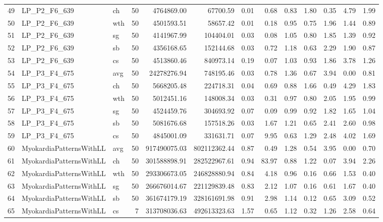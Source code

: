 \documentclass{article}
\begin{document}
\begin{table}[ht]
{\begin{tabular}{lllrrrrrrrrrr}
49 & LP_P2_F6_639 & ch & 50 & 4764869.00 & 67700.59 & 0.01 & 0.68 & 0.83 & 1.80 & 0.35 & 4.79 & 1.99 \\
50 & LP_P2_F6_639 & wth & 50 & 4501593.51 & 58657.42 & 0.01 & 0.18 & 0.95 & 0.75 & 1.96 & 1.44 & 0.89 \\
51 & LP_P2_F6_639 & sg & 50 & 4141967.99 & 104404.01 & 0.03 & 0.08 & 1.05 & 0.80 & 1.85 & 1.39 & 0.92 \\
52 & LP_P2_F6_639 & sb & 50 & 4356168.65 & 152144.68 & 0.03 & 0.72 & 1.18 & 0.63 & 2.29 & 1.90 & 0.87 \\
53 & LP_P2_F6_639 & cs & 50 & 4513860.46 & 840973.14 & 0.19 & 0.07 & 1.03 & 0.93 & 1.86 & 3.78 & 1.26 \\
54 & LP_P3_F4_675 & avg & 50 & 24278276.94 & 748195.46 & 0.03 & 0.78 & 1.36 & 0.67 & 3.94 & 0.00 & 0.81 \\
55 & LP_P3_F4_675 & ch & 50 & 5668205.48 & 224718.31 & 0.04 & 0.69 & 0.88 & 1.66 & 0.49 & 4.29 & 1.83 \\
56 & LP_P3_F4_675 & wth & 50 & 5012451.16 & 148008.34 & 0.03 & 0.31 & 0.97 & 0.80 & 2.05 & 1.95 & 0.99 \\
57 & LP_P3_F4_675 & sg & 50 & 4524459.76 & 304693.92 & 0.07 & 0.09 & 0.99 & 0.92 & 1.82 & 1.65 & 1.04 \\
58 & LP_P3_F4_675 & sb & 50 & 5081676.68 & 157518.26 & 0.03 & 1.67 & 1.21 & 0.65 & 2.41 & 2.60 & 0.98 \\
59 & LP_P3_F4_675 & cs & 50 & 4845001.09 & 331631.71 & 0.07 & 9.95 & 0.63 & 1.29 & 2.48 & 4.02 & 1.69 \\
60 & MyokardiaPatternsWithLL & avg & 50 & 917490075.03 & 802112362.44 & 0.87 & 0.49 & 1.28 & 0.54 & 3.95 & 0.00 & 0.70 \\
61 & MyokardiaPatternsWithLL & ch & 50 & 301588898.91 & 282522967.61 & 0.94 & 83.97 & 0.88 & 1.22 & 0.07 & 3.94 & 2.26 \\
62 & MyokardiaPatternsWithLL & wth & 50 & 293306673.05 & 246828880.94 & 0.84 & 4.18 & 0.96 & 0.16 & 0.66 & 1.53 & 0.40 \\
63 & MyokardiaPatternsWithLL & sg & 50 & 266676014.67 & 221129839.48 & 0.83 & 2.12 & 1.07 & 0.16 & 0.61 & 1.67 & 0.40 \\
64 & MyokardiaPatternsWithLL & sb & 50 & 361674179.19 & 328161691.98 & 0.91 & 2.98 & 1.14 & 0.12 & 0.65 & 3.09 & 0.52 \\
65 & MyokardiaPatternsWithLL & cs & 7 & 313708036.63 & 492613323.63 & 1.57 & 0.65 & 1.12 & 0.32 & 1.26 & 2.58 & 0.64 \\
\bottomrule
\end{tabular}%
}
\end{table}
\end{document}
